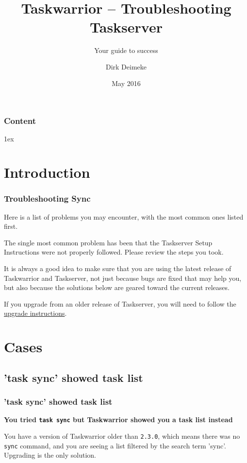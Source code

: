 \documentclass[t,handout]{beamer}
\title{Taskwarrior -- Troubleshooting Taskserver}
\subtitle{Your guide to success}
\author[Deimeke, Dirk]{Dirk Deimeke}
\institute[Taskwarrior Academy]{Taskwarrior Academy}
\date{May 2016}
\begin{document}
\begin{frame} %
	\titlepage
\end{frame}


\begin{frame}\frametitle{Content}
	\tableofcontents
\end{frame}

\parskip1ex

\section{Introduction}

\begin{frame}[fragile]\frametitle{Troubleshooting Sync}
    \vfill
    Here is a list of problems you may encounter, with the most common ones listed first.

    The single most common problem has been that the Taskserver Setup Instructions were not properly followed.  Please review the steps you took.

    It is always a good idea to make sure that you are using the latest release of Taskwarrior and Taskserver, not just because bugs are fixed that may help you, but also because the solutions below are geared toward the current releases.

    If you upgrade from an older release of Taskserver, you will need to follow the \href{http://taskwarrior.org/docs/taskserver/upgrade.html}{upgrade instructions}.
\end{frame}

\section{Cases}

\subsection{'task sync' showed task list}

\begin{frame}[fragile]\frametitle{'task sync' showed task list}
    \vfill
    \textbf{You tried \texttt{task sync} but Taskwarrior showed you a task list instead}

    You have a version of Taskwarrior older than \verb+2.3.0+, which means there was no \verb+sync+ command, and you are seeing a list filtered by the search term 'sync'. Upgrading is the only solution.
\end{frame}
\end{document}
